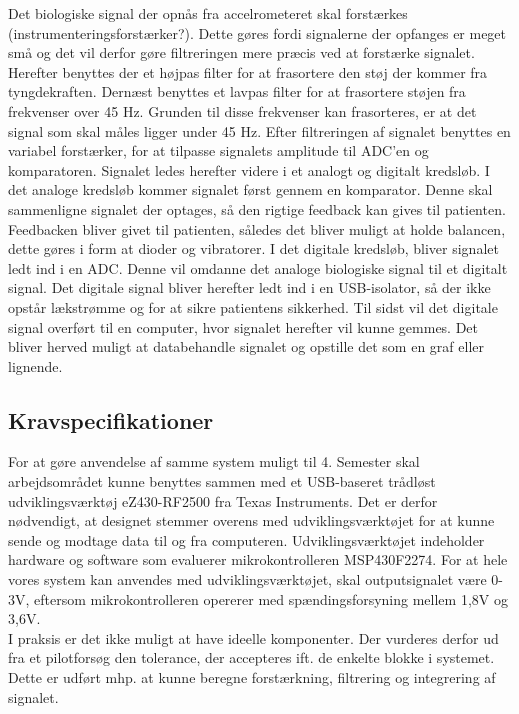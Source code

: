 Det biologiske signal der opnås fra accelrometeret skal forstærkes (instrumenteringsforstærker?). Dette gøres fordi signalerne der opfanges er meget små og det vil derfor gøre filtreringen mere præcis ved at forstærke signalet.
Herefter benyttes der et højpas filter for at frasortere den støj der kommer fra tyngdekraften.  Dernæst benyttes et lavpas filter for at frasortere støjen fra frekvenser over 45 Hz. Grunden til disse frekvenser kan frasorteres, er at det signal som skal måles ligger under 45 Hz. Efter filtreringen af signalet benyttes en variabel forstærker, for at tilpasse signalets amplitude til ADC’en og komparatoren. Signalet ledes herefter videre i et analogt og digitalt kredsløb. I det analoge kredsløb kommer signalet først gennem en komparator. Denne skal sammenligne signalet der optages, så den rigtige feedback kan gives til patienten. Feedbacken bliver givet til patienten, således det bliver muligt at holde balancen, dette gøres i form at dioder og vibratorer. I det digitale kredsløb, bliver signalet ledt ind i en ADC. Denne vil omdanne det analoge biologiske signal til et digitalt signal. Det digitale signal bliver herefter ledt ind i en USB-isolator, så der ikke opstår lækstrømme og for at sikre patientens sikkerhed. Til sidst vil det digitale signal overført til en computer, hvor signalet herefter vil kunne gemmes. Det bliver herved muligt at databehandle signalet og opstille det som en graf eller lignende.

\subsection{Kravspecifikationer}
For at gøre anvendelse af samme system muligt til 4. Semester skal arbejdsområdet kunne benyttes sammen med et USB-baseret trådløst udviklingsværktøj eZ430-RF2500 fra Texas Instruments. Det er derfor nødvendigt, at designet stemmer overens med udviklingsværktøjet for at kunne sende og modtage data til og fra computeren. Udviklingsværktøjet indeholder hardware og software som evaluerer mikrokontrolleren MSP430F2274. For at hele vores system kan anvendes med udviklingsværktøjet, skal outputsignalet være 0-3V, eftersom mikrokontrolleren opererer med spændingsforsyning mellem 1,8V og 3,6V. \\
I praksis er det ikke muligt at have ideelle komponenter. Der vurderes derfor ud fra et pilotforsøg den tolerance, der accepteres ift. de enkelte blokke i systemet. Dette er udført mhp. at kunne beregne forstærkning, filtrering og integrering af signalet.

